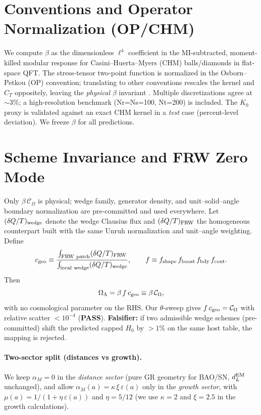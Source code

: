 \documentclass[aps,prd,onecolumn,notitlepage,superscriptaddress,nofootinbib]{revtex4-2}
\newcommand{\COmega}{\mathcal{C}_{\Omega}}
\newcommand{\OL}{\Omega_{\Lambda}}
\newcommand{\alpham}{\alpha_M}
\newcommand{\Hzero}{H_0}
\newcommand{\eps}{\varepsilon}
\begin{document}
\section{Conventions and Operator Normalization (OP/CHM)}
We compute \(\beta\) as the dimensionless \(\ell^4\) coefficient in the MI-subtracted, moment-killed modular response for Casini–Huerta–Myers (CHM) balls/diamonds in flat-space QFT. The stress-tensor two-point function is normalized in the Osborn–Petkou (OP) convention; translating to other conventions rescales the kernel and \(C_T\) oppositely, leaving the \emph{physical} \(\beta\) invariant \cite{OsbornPetkou1994}. Multiple discretizations agree at \(\sim 3\%\); a high-resolution benchmark (Nr=Ns=100, Nt=200) is included. The \(K_0\) proxy is validated against an exact CHM kernel in a \emph{test} case (percent-level deviation). We freeze \(\beta\) for all predictions.

\section{Scheme Invariance and FRW Zero Mode}
Only \(\beta\,\COmega\) is physical; wedge family, generator density, and unit–solid–angle boundary normalization are pre-committed and used everywhere. Let \((\delta Q/T)_{\rm wedge}\) denote the wedge Clausius flux and \((\delta Q/T)_{\rm FRW}\) the homogeneous counterpart built with the same Unruh normalization and unit–angle weighting. Define
\begin{equation}
  c_{\rm geo}\equiv \frac{\int_{\rm FRW\ patch} (\delta Q/T)_{\rm FRW}}{\int_{\rm local\ wedge} (\delta Q/T)_{\rm wedge}},\qquad
  f\equiv f_{\rm shape}\,f_{\rm boost}\,f_{\rm bdy}\,f_{\rm cont}.
\end{equation}
Then
\begin{equation}
  \OL=\beta\,f\,c_{\rm geo}\equiv \beta\,\COmega,
\end{equation}
with no cosmological parameter on the RHS. Our \(\theta\)-sweep gives \(f\,c_{\rm geo}=\COmega\) with relative scatter \(<10^{-4}\) (\textbf{PASS}). \textbf{Falsifier:} if two admissible wedge schemes (pre-committed) shift the predicted capped \(\Hzero\) by \(>1\%\) on the same host table, the mapping is rejected.

\paragraph*{Two-sector split (distances vs growth).}
We keep \(\alpham=0\) in the \emph{distance sector} (pure GR geometry for BAO/SN, \(d_L^{\rm EM}\) unchanged), and allow \(\alpham(a)=\kappa\,\xi\,\eps(a)\) only in the \emph{growth sector}, with \(\mu(a)=1/(1+\eta\,\eps(a))\) and \(\eta=5/12\) (we use \(\kappa=2\) and \(\xi=2.5\) in the growth calculations).
\end{document}
